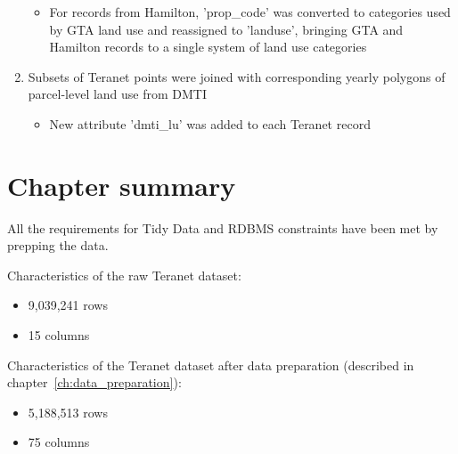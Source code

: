 \begin{enumerate}
\begin{itemize}
        \item For records from Hamilton, 'prop\_code' was converted to categories used by GTA land use and reassigned to 'landuse', bringing GTA and Hamilton records to a single system of land use categories
    \end{itemize}
    \item Subsets of Teranet points were joined with corresponding yearly polygons of parcel-level land use from DMTI
    \begin{itemize}
        \item New attribute 'dmti\_lu' was added to each Teranet record
    \end{itemize}
\end{enumerate}





\section{Chapter summary} \label{sec:data_preparation_summary}

All the requirements for Tidy Data and RDBMS constraints have been met by prepping the data.

Characteristics of the raw Teranet dataset:
\begin{itemize}
    \item 9,039,241 rows
    \item 15 columns
\end{itemize}

Characteristics of the Teranet dataset after data preparation (described in chapter~\ref{ch:data_preparation}):
\begin{itemize}
    \item 5,188,513 rows
    \item 75 columns
\end{itemize}
